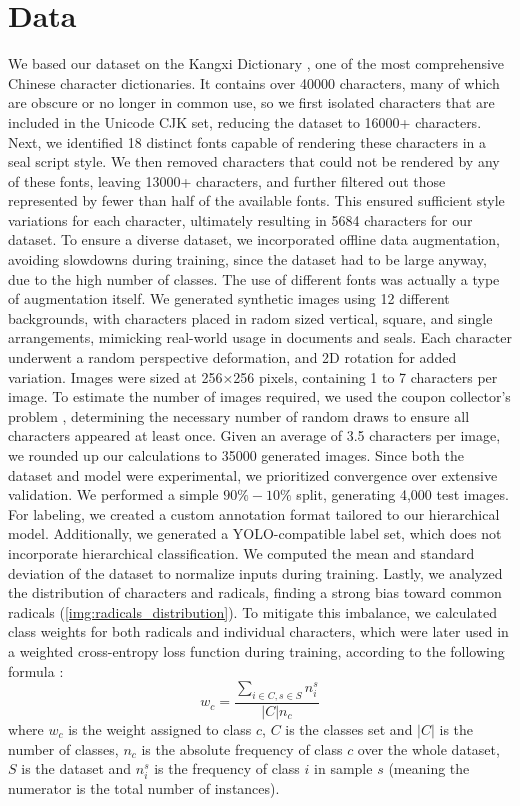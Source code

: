 \section{Data}
\label{sec:data}

We based our dataset on the Kangxi Dictionary \cite{WikipediaKangxi}, one of the most comprehensive Chinese character dictionaries. It contains over 40000 characters, many of which are obscure or no longer in common use, so we first isolated characters that are included in the Unicode CJK set, reducing the dataset to 16000+ characters.
Next, we identified 18 distinct fonts capable of rendering these characters in a seal script style. We then removed characters that could not be rendered by any of these fonts, leaving 13000+ characters, and further filtered out those represented by fewer than half of the available fonts. This ensured sufficient style variations for each character, ultimately resulting in 5684 characters for our dataset. To ensure a diverse dataset, we incorporated offline data augmentation, avoiding slowdowns during training, since the dataset had to be large anyway, due to the high number of classes. The use of different fonts was actually a type of augmentation itself. We generated synthetic images using 12 different backgrounds, with characters placed in radom sized vertical, square, and single arrangements, mimicking real-world usage in documents and seals. Each character underwent a random perspective deformation, and 2D rotation for added variation. Images were sized at 256×256 pixels, containing 1 to 7 characters per image.
To estimate the number of images required, we used the coupon collector’s problem \cite{CouponCollectorProblem}, determining the necessary number of random draws to ensure all characters appeared at least once.
Given an average of 3.5 characters per image, we rounded up our calculations to 35000 generated images. Since both the dataset and model were experimental, we prioritized convergence over extensive validation. We performed a simple $90\%-10\%$ split, generating 4,000 test images.
For labeling, we created a custom annotation format tailored to our hierarchical model. Additionally, we generated a YOLO-compatible label set, which does not incorporate hierarchical classification. We computed the mean and standard deviation of the dataset to normalize inputs during training. Lastly, we analyzed the distribution of characters and radicals, finding a strong bias toward common radicals (\ref{img:radicals_distribution}). To mitigate this imbalance, we calculated class weights for both radicals and individual characters, which were later used in a weighted cross-entropy loss function during training, according to the following formula \cite{WeightsFormulaArticle}:
\[
    w_c = \frac{\sum_{i \in C, s \in S}{n^s_i}}{|C| n_c}
\]
where $w_c$ is the weight assigned to class $c$, $C$ is the classes set and $|C|$ is the number of classes, $n_c$ is the absolute frequency of class $c$ over the whole dataset, $S$ is the dataset and $n^s_i$ is the frequency of class $i$ in sample $s$ (meaning the numerator is the total number of instances).

